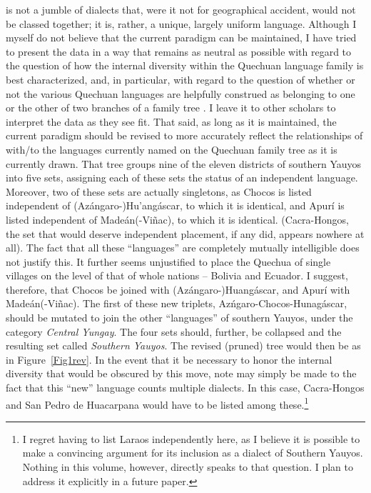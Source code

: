 \SYQ{} is not a jumble of dialects that, were it not for geographical accident, would not be classed together; it is, rather, a unique, largely uniform language. Although I myself do not believe that the current paradigm can be maintained, I have tried to present the data in a way that remains as neutral as possible with regard to the question of how the internal diversity within the Quechuan language family is best characterized, and, in particular, with regard to the question of whether or not the various Quechuan languages are helpfully construed as belonging to one or the other of two branches of a family tree \citep[See in particular][]{Adelaar08}. I leave it to other scholars to interpret the data as they see fit. That said, as long as it is maintained, the current paradigm should be revised to more accurately reflect the relationships of \SYQ{} with/to the languages currently named on the Quechuan family tree as it is currently drawn. That tree groups nine of the eleven districts of southern Yauyos into five sets, assigning each of these sets the status of an independent language. Moreover, two of these sets are actually singletons, as Chocos is listed independent of \mbox{(Az\'angaro-)}Hu'ang\'ascar, to which it is identical, and Apur\'i is listed independent of Made\'an(-Vi\~nac), to which it is identical. (Cacra-Hongos, the set that would deserve independent placement, if any did, appears nowhere at all). The fact that all these ``languages'' are completely mutually intelligible does not justify this. It further seems unjustified to place the Quechua of single villages on the level of that of whole nations -- Bolivia and Ecuador. I suggest, therefore, that Chocos be joined with \mbox{(Az\'angaro-)}Huang\'ascar, and Apur\'i with Made\'an(-Vi\~nac). The first of these new triplets, Az\'ngaro-Chocos-Hunag\'ascar, should be mutated to join the other ``languages'' of southern Yauyos, under the category \textit{Central Yungay}. The four sets should, further, be collapsed and the resulting set called \textit{Southern Yauyos}. The revised (pruned) tree would then be as in Figure~\ref{Fig1rev}. In the event that it be necessary to honor the internal diversity that would be obscured by this move, note may simply be made to the fact that this ``new'' language counts multiple dialects. In this case, Cacra-Hongos and San Pedro de Huacarpana would have to be listed among these.\footnote{I regret having to list Laraos independently here, as I believe it is possible to make a convincing argument for its inclusion as a dialect of Southern Yauyos. Nothing in this volume, however, directly speaks to that question. I plan to address it explicitly in a future paper.}

